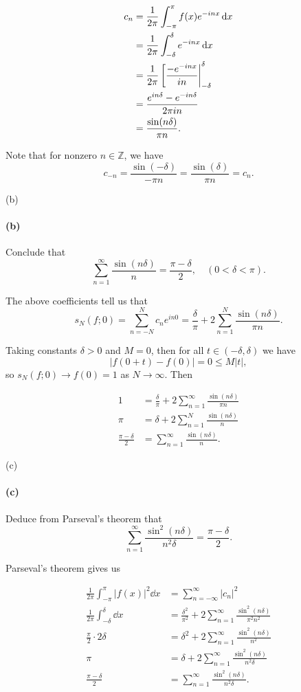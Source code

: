 \documentclass[12pt]{article}
\newenvironment{fullbox}{\begin{lrbox}{\savefullbox}\begin{minipage}{\dimexpr\textwidth-2\fboxsep\relax}}{\end{minipage}\end{lrbox}\begin{center}\framebox[\textwidth]{\usebox{\savefullbox}}\end{center}}
\newenvironment{pbox}[1][]{\begin{fullbox}\ifx#1\empty\else\paragraph{#1}\fi}{\end{fullbox}}
\theoremstyle{definition}
\newcommand{\Z}{\mathbb{Z}}
\begin{document}
\begin{align*}
    c_n &= \frac{1}{2\pi} \int_{-\pi}^{\pi} f(x)e^{-inx} \dd{x} \\
        &= \frac{1}{2\pi} \int_{-\delta}^{\delta} e^{-inx} \dd{x} \\
        &= \frac{1}{2\pi} \eval[\frac{-e^{-inx}}{ i n}|_{-\delta}^{\delta} \\
        &= \frac{e^{in\delta} - e^{-in\delta}}{2\pi in} \\
        &= \frac{\sin(n\delta)}{\pi n}.
\end{align*}

Note that for nonzero $n \in \Z$, we have
\[
    c_{-n}
        = \frac{\sin(-\delta)}{-\pi n}
        = \frac{\sin(\delta)}{\pi n}
        = c_n.
\]


\begin{pbox}[(b)]
    Conclude that
    \[
        \sum_{n=1}^{\infty} \frac{\sin(n\delta)}{n} = \frac{\pi - \delta}{2}, \quad (0 < \delta < \pi).
    \]
\end{pbox}

The above coefficients tell us that
\[
    s_N(f; 0)
        = \sum_{n=-N}^{N} c_n e^{in0}
        = \frac{\delta}{\pi} + 2\sum_{n=1}^{N} \frac{\sin(n\delta)}{\pi n}.
\]


Taking constants $\delta > 0$ and $M = 0$, then for all $t \in (-\delta, \delta)$ we have
\[
    |f(0 + t) - f(0)| = 0 \leq M|t|,
\]
so $s_N(f; 0) \to f(0) = 1$ as $N \to \infty$. Then

\begin{align*}
    1 &= \frac{\delta}{\pi} + 2\sum_{n=1}^{\infty} \frac{\sin(n\delta)}{\pi n} \\
    \pi &= \delta + 2\sum_{n=1}^{N} \frac{\sin(n\delta)}{n} \\
    \frac{\pi - \delta}{2} &= \sum_{n=1}^{\infty} \frac{\sin(n\delta)}{n}.
\end{align*}




\begin{pbox}[(c)]
    Deduce from Parseval's theorem that
    \[
        \sum_{n=1}^{\infty} \frac{\sin^2(n\delta)}{n^2\delta} = \frac{\pi - \delta}{2}.
    \]
\end{pbox}

Parseval's theorem gives us

\begin{align*}
    \frac{1}{2\pi} \int_{-\pi}^{\pi} |f(x)|^2 \dd{x} &= \sum_{n=-\infty}^{\infty} |c_n|^2 \\
    \frac{1}{2\pi} \int_{-\delta}^{\delta} \dd{x} &= \frac{\delta^2}{\pi^2} + 2\sum_{n=1}^{\infty} \frac{\sin^2(n\delta)}{\pi^2 n^2} \\  
    \frac{\pi}{2} \cdot 2\delta &= \delta^2 + 2\sum_{n=1}^{\infty} \frac{\sin^2(n\delta)}{n^2} \\  
    \pi &= \delta + 2\sum_{n=1}^{\infty} \frac{\sin^2(n\delta)}{n^2\delta} \\  
    \frac{\pi - \delta}{2} &= \sum_{n=1}^{\infty} \frac{\sin^2(n\delta)}{n^2\delta}.
\end{align*}
\end{document}
